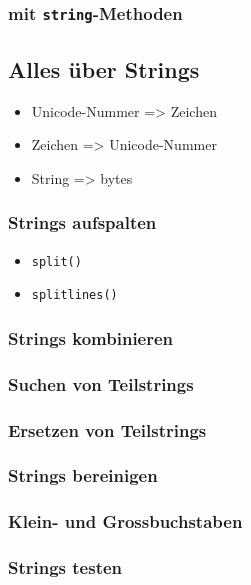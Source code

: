 \subsubsection{mit \texttt{string}-Methoden}


\subsection{Alles über Strings}
\begin{itemize}
	\item Unicode-Nummer => Zeichen
	
	\item Zeichen => Unicode-Nummer
	
	\item String => bytes
	
\end{itemize}

\subsubsection{Strings aufspalten}
\begin{itemize}
	\item \texttt{split()}
	
	\item \texttt{splitlines()}
	
\end{itemize}

\subsubsection{Strings kombinieren}


\subsubsection{Suchen von Teilstrings}


\subsubsection{Ersetzen von Teilstrings}


\subsubsection{Strings bereinigen}


\subsubsection{Klein- und Grossbuchstaben}


\subsubsection{Strings testen}
